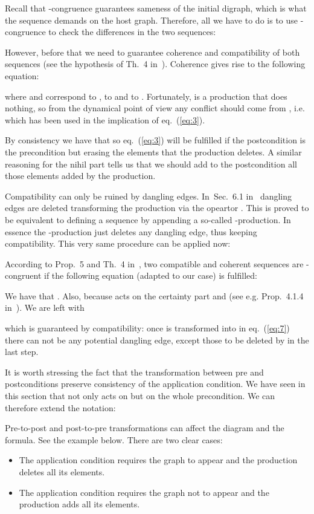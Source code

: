 \documentclass{fundam}
\newcommand{\proofend}{\hfill}
\begin{document}
Recall that -congruence guarantees sameness of the initial digraph,
which is what the sequence demands on the host graph. Therefore, all
we have to do is to use -congruence to check the differences in the
two sequences:

However, before that we need to guarantee coherence and compatibility
of both sequences (see the hypothesis of Th.~4
in~\cite{MGGCombinatorics}). Coherence gives rise to the following
equation:

where  and  correspond to ,  to
 and  to
. Fortunately,  is a production
that does nothing, so from the dynamical point of view any conflict
should come from , i.e.  which has been used in the
implication of eq.~(\ref{eq:3}).

By consistency we have that  so eq.~(\ref{eq:3}) will be fulfilled if the
postcondition is the precondition but erasing the elements that the
production deletes. A similar reasoning for the nihil part tells us
that we should add to the postcondition all those elements added by
the production.

Compatibility can only be ruined by dangling edges. In~Sec.~6.1
in~\cite{MGGBook} dangling edges are deleted transforming the
production via the opeartor . This is proved to be
equivalent to defining a sequence by appending a so-called
-production. In essence the -production just
deletes any dangling edge, thus keeping compatibility. This very same
procedure can be applied now:


According to Prop.~5 and Th.~4 in~\cite{MGGCombinatorics}, two
compatible and coherent sequences are -congruent if the following
equation (adapted to our case) is fulfilled:

We have that . Also,
 because
 acts on the certainty part and
 (see e.g. Prop.~4.1.4 in~\cite{handbook}). We are
left with

which is guaranteed by compatibility: once
 is transformed into
 in
eq.~(\ref{eq:7}) there can not be any potential dangling edge, except
those to be deleted by  in the last step. \proofend 

It is worth stressing the fact that the transformation between pre and
postconditions preserve consistency of the application condition. We
have seen in this section that  not only acts on  but on the
whole precondition. We can therefore extend the notation:


Pre-to-post and post-to-pre transformations can affect the diagram and
the formula. See the example below. There are two clear cases:
\begin{itemize}
\item The application condition requires the graph to appear and the
  production deletes all its elements.
\item The application condition requires the graph not to appear and
  the production adds all its elements.
\end{itemize}
\end{document}
